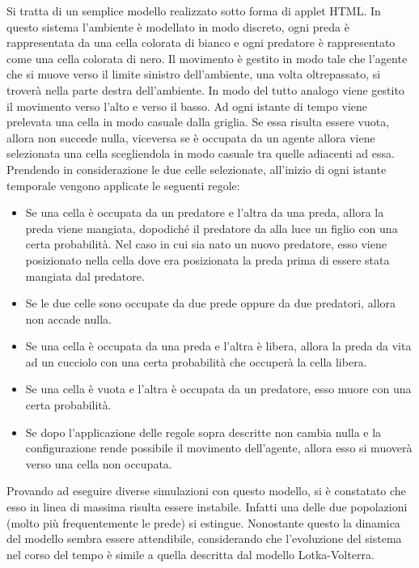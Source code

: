 \documentclass[11pt]{article}
\begin{document}
Si tratta di un semplice modello realizzato sotto forma di applet HTML. In questo sistema l'ambiente è modellato in modo discreto, ogni preda è rappresentata da una cella colorata di bianco e ogni predatore è rappresentato come una cella colorata di nero. Il movimento è gestito in modo tale che l'agente che si muove verso il limite sinistro dell'ambiente, una volta oltrepassato, si troverà nella parte destra dell'ambiente. In modo del tutto analogo viene gestito il movimento verso l'alto e verso il basso. Ad ogni istante di tempo viene prelevata una cella in modo casuale dalla griglia. Se essa risulta essere vuota, allora non succede nulla, viceversa se è occupata da un agente allora viene selezionata una cella scegliendola in modo casuale tra quelle adiacenti ad essa. Prendendo in considerazione le due celle selezionate, all'inizio di ogni istante temporale vengono applicate le seguenti regole\cite{PhysicsofRisk}:
\begin{itemize}
    \item Se una cella è occupata da un predatore e l'altra da una preda, allora la preda viene mangiata, dopodiché il predatore da alla luce un figlio con una certa probabilità. Nel caso in cui sia nato un nuovo predatore, esso viene posizionato nella cella dove era posizionata la preda prima di essere stata mangiata dal predatore.
    \item Se le due celle sono occupate da due prede oppure da due predatori, allora non accade nulla.
    \item Se una cella è occupata da una preda e l'altra è libera, allora la preda da vita ad un cucciolo con una certa probabilità che occuperà la cella libera. 
    \item Se una cella è vuota e l'altra è occupata da un predatore, esso muore con una certa probabilità. 
    \item Se dopo l'applicazione delle regole sopra descritte non cambia nulla e la configurazione rende possibile il movimento dell'agente, allora esso si muoverà verso una cella non occupata. 
\end{itemize}

Provando ad eseguire diverse simulazioni con questo modello, si è constatato che esso in linea di massima risulta essere instabile. Infatti una delle due popolazioni (molto più frequentemente le prede) si estingue. Nonostante questo la dinamica del modello sembra essere attendibile, considerando che l'evoluzione del sistema nel corso del tempo è simile a quella descritta dal modello Lotka-Volterra. 
\end{document}
